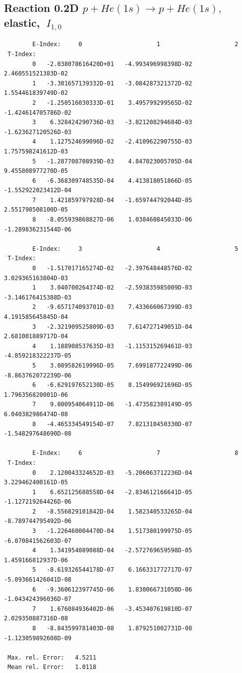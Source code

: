 \documentclass[12pt,dvips]{article}
\begin{document}
\subsection{
Reaction 0.2D $ p + He(1s) \rightarrow p + He(1s) ,\  $
elastic, $ \  I_{1,0} $
}

\begin{small}\begin{verbatim}
        E-Index:     0                     1                     2
 T-Index:
        0   -2.038078616420D+01   -4.993496998398D-02    2.460551521383D-02
        1   -3.301657139332D-01   -3.084287321372D-02    1.554461839749D-02
        2   -1.250516030333D-01    3.495799299565D-02   -1.424614705786D-02
        3    6.328424290736D-03   -3.821208294684D-03   -1.623627120526D-03
        4    1.127524699096D-02   -2.410962290755D-03    1.757598241612D-03
        5   -1.287708708939D-03    4.847023005705D-04    9.455808977270D-05
        6   -6.368309748535D-04    4.413818051866D-05   -1.552922023412D-04
        7    1.421859797928D-04   -1.659744792044D-05    2.551798508100D-05
        8   -8.055939868827D-06    1.038460845033D-06   -1.289836231544D-06

        E-Index:     3                     4                     5
 T-Index:
        0   -1.517017165274D-02   -2.397648448576D-02    3.029365163804D-03
        1    3.040700264374D-02   -2.593835985009D-03   -3.146176415388D-03
        2   -9.657174093701D-03    7.433666067399D-03    4.191585645845D-04
        3   -2.321909525809D-03    7.614727149051D-04    2.681001889717D-04
        4    1.188908537635D-03   -1.115315269461D-03   -4.859218322237D-05
        5    3.089582619996D-05    7.699187722499D-06   -8.863762072239D-06
        6   -6.629197652130D-05    8.154996921696D-05    1.796356820001D-06
        7    9.800954064911D-06   -1.473582389149D-05    6.040382986474D-08
        8   -4.465334549154D-07    7.821310450330D-07   -1.548297648690D-08

        E-Index:     6                     7                     8
 T-Index:
        0    2.120043324652D-03   -5.206063712236D-04    3.229462400161D-05
        1    6.652125688558D-04   -2.834612166641D-05   -1.127219264426D-06
        2   -8.556829101842D-04    1.582340533265D-04   -8.789744795492D-06
        3   -1.226460004470D-04    1.517380199975D-05   -6.070841562603D-07
        4    1.341954089088D-04   -2.572769659598D-05    1.459166812937D-06
        5   -8.619326544178D-07    6.166331772717D-07   -5.093661426041D-08
        6   -9.360612397745D-06    1.830066731050D-06   -1.043424396036D-07
        7    1.676084936402D-06   -3.453407619810D-07    2.029350887316D-08
        8   -8.843599781403D-08    1.879251002731D-08   -1.123059892608D-09

 Max. rel. Error:   4.5211
 Mean rel. Error:   1.0118
\end{verbatim}\end{small}
\end{document}
